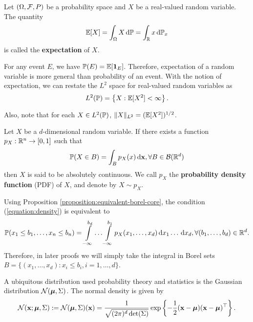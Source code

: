 \begin{definition}
  Let $(\Omega, \mathcal{F}, P)$ be a probability space and $X$ be a real-valued random variable. The quantity
  \begin{equation}
    \mathbb{E}[X]=\int_{\Omega}X\,\mathrm{d}\mathbb{P}=\int_{\mathbb{R}}x\,\mathrm{d} \mathbb{P}_x
  \end{equation}
  is called the \textbf{expectation} of $X$.
\end{definition}

For any event $E$, we have $\mathbb{P}(E) = \mathbb{E}[\mathbf{1}_E]$. Therefore, expectation of a random variable is more general than probability of an event. With the notion of expectation, we can restate the $L^2$ space for real-valued random variables as
\begin{equation}
  L^2(\mathbb{P}) = \left\{X : \mathbb{E}[X^2] < \infty \right\}.
\end{equation}

Also, note that for each $X\in L^2(\mathbb{P})$, $\|X\|_{L^2} = (\mathbb{E}[X^2])^{1/2}$.

\begin{definition}
  Let $X$ be a $d$-dimensional random variable. If there exists a function $p_X:\mathbb{R}^n\to [0,1]$ such that
  \begin{equation}
    \label{equation:density}
    \mathbb{P}(X\in B)=\int_B p_X(x)\,\mathrm{d} \mathbf{x}, \forall B\in \mathcal{B}(\mathbb{R}^d)
  \end{equation}
  then $X$ is said to be absolutely continuous. We call $p_X$ the \textbf{probability density function} (PDF) of $X$, and denote by $X\sim p_X$.
\end{definition}

\begin{remark}
  Using Proposition \ref{proposition:equivalent-borel-core}, the condition (\ref{equation:density}) is equivalent to
  \begin{equation}
    \mathbb{P}(x_1\le b_1, \ldots, x_n\le b_n)=\int\limits_{-\infty}^{b_d}\ldots\int\limits_{-\infty}^{b_1} p_X(x_1,\ldots,x_d)\,\mathrm{d} x_1\ldots\,\mathrm{d} x_d, \forall (b_1,\ldots,b_d)\in \mathbb{R}^d.
  \end{equation}
  Therefore, in later proofs we will simply take the integral in Borel sets $B=\{(x_1,\ldots,x_d): x_i\le b_i, i=1,\ldots,d\}$.
\end{remark}

\begin{example}
  A ubiquitous distribution used probability theory and statistics is the Gaussian distribution $\mathcal{N}(\bm{\mu}, \Sigma)$. The normal density is given by
  \begin{equation}
    \mathcal{N}(\mathbf{x};\bm{\mu}, \Sigma) := \mathcal{N}(\bm{\mu}, \Sigma)(\mathbf{x}) = \dfrac{1}{\sqrt{(2\pi)^d\det(\Sigma)}}\exp\left\{-\dfrac{1}{2}(\mathbf{x}-\bm{\mu})(\mathbf{x}-\bm{\mu})^\top\right\}.
  \end{equation}
\end{example}

